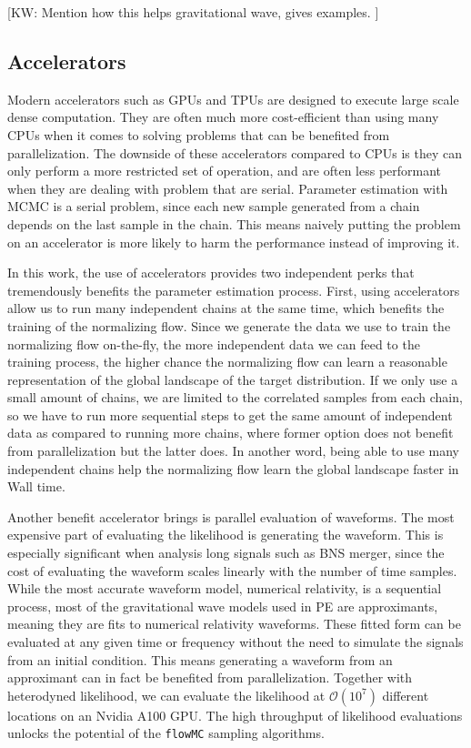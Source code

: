 \documentclass[twocolumn]{aastex631}
\newcommand{\kw}[1]{{\color{rb4}[KW: #1 ]}}
\begin{document}
\kw{Mention how this helps gravitational wave, gives examples.}


\subsection{Accelerators}
\label{sec:accelerators}

Modern accelerators such as GPUs and TPUs are designed to execute large scale
dense computation. They are often much more cost-efficient than using many CPUs
when it comes to solving problems that can be benefited from parallelization.
The downside of these accelerators compared to CPUs is they can only perform a
more restricted set of operation, and are often less performant when they are
dealing with problem that are serial. Parameter estimation with MCMC is a serial
problem, since each new sample generated from a chain depends on the last sample
in the chain. This means naively putting the problem on an accelerator is more
likely to harm the performance instead of improving it.


In this work, the use of accelerators provides two independent perks that
tremendously benefits the parameter estimation process. First, using
accelerators allow us to run many independent chains at the same time, which
benefits the training of the normalizing flow. Since we generate the data we use
to train the normalizing flow on-the-fly, the more independent data we can feed
to the training process, the higher chance the normalizing flow can learn a
reasonable representation of the global landscape of the target distribution. If
we only use a small amount of chains, we are limited to the correlated samples
from each chain, so we have to run more sequential steps to get the same amount
of independent data as compared to running more chains, where former option does
not benefit from parallelization but the latter does. In another word, being
able to use many independent chains help the normalizing flow learn the global
landscape faster in Wall time.


Another benefit accelerator brings is parallel evaluation of waveforms. The most
expensive part of evaluating the likelihood is generating the waveform. This is
especially significant when analysis long signals such as BNS merger, since the
cost of evaluating the waveform scales linearly with the number of time samples.
While the most accurate waveform model, numerical relativity, is a sequential
process, most of the gravitational wave models used in PE are approximants,
meaning they are fits to numerical relativity waveforms. These fitted form can
be evaluated at any given time or frequency without the need to simulate the
signals from an initial condition. This means generating a waveform from an
approximant can in fact be benefited from parallelization. Together with
heterodyned likelihood, we can evaluate the likelihood at $\mathcal{O}(10^7)$
different locations on an Nvidia A100 GPU. The high throughput of likelihood
evaluations unlocks the potential of the \texttt{flowMC} sampling algorithms.
\end{document}

